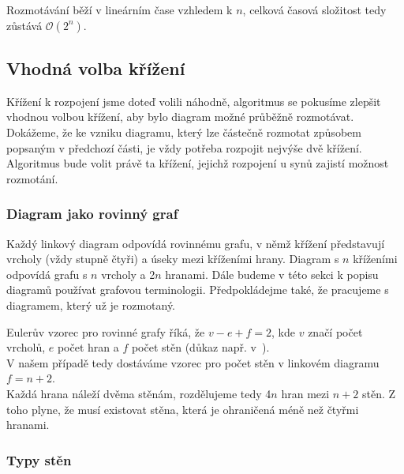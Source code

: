 Rozmotávání běží v lineárním čase vzhledem k $n$, celková časová složitost tedy zůstává $\mathcal{O}(2^n)$.

\subsection{Vhodná volba křížení} \label{volba}
Křížení k rozpojení jsme doteď volili náhodně, algoritmus se pokusíme zlepšit vhodnou volbou křížení, aby bylo diagram možné průběžně rozmotávat.
Dokážeme, že ke vzniku diagramu, který lze částečně rozmotat způsobem popsaným v předchozí části, je vždy potřeba rozpojit nejvýše dvě křížení.
Algoritmus bude volit právě ta křížení, jejichž rozpojení u synů zajistí možnost rozmotání.

\subsubsection{Diagram jako rovinný graf} \label{jakograf}
Každý linkový diagram odpovídá rovinnému grafu, v němž křížení představují vrcholy (vždy stupně čtyři) a úseky mezi kříženími hrany. Diagram s $n$ kříženími odpovídá grafu s $n$ vrcholy a 2$n$ hranami.
Dále budeme v této sekci k popisu diagramů používat grafovou terminologii. Předpokládejme také, že pracujeme s diagramem, který už je rozmotaný.

Eulerův vzorec pro rovinné grafy říká, že $v - e +f = 2$, kde $v$ značí počet vrcholů, $e$ počet hran a $f$ počet stěn (důkaz např. v~\cite{kapitoly}).
\\
V našem případě tedy dostáváme vzorec pro počet stěn v linkovém diagramu $f = n+2$.
\\
Každá hrana náleží dvěma stěnám, rozdělujeme tedy 4$n$ hran mezi $n+2$ stěn. Z toho plyne, že musí existovat stěna, která je ohraničená méně než čtyřmi hranami.  

\subsubsection{Typy stěn} \label{steny}


